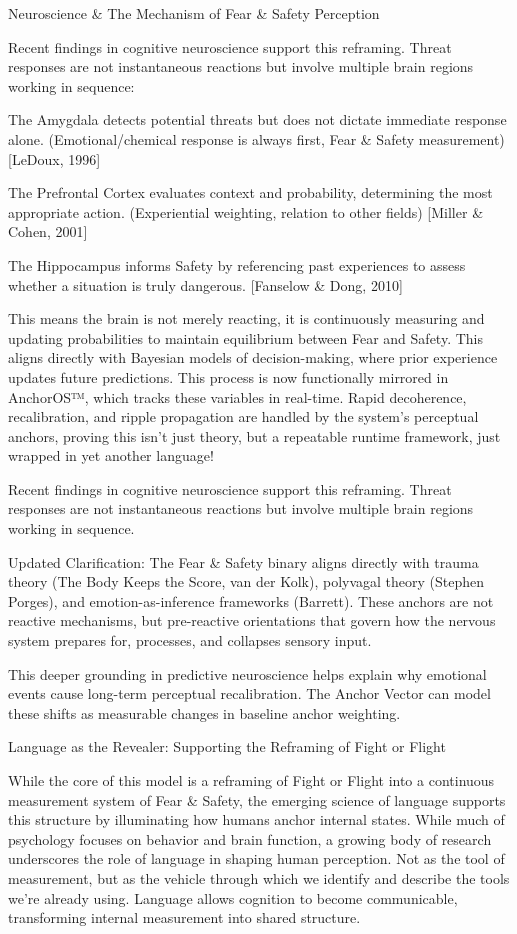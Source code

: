 \documentclass[11pt]{article}
\begin{document}
Neuroscience & The Mechanism of Fear & Safety Perception

Recent findings in cognitive neuroscience support this reframing. Threat responses are not instantaneous reactions but involve multiple brain regions working in sequence:

The Amygdala detects potential threats but does not dictate immediate response alone. (Emotional/chemical response is always first, Fear & Safety measurement) [LeDoux, 1996]

The Prefrontal Cortex evaluates context and probability, determining the most appropriate action. (Experiential weighting, relation to other fields) [Miller & Cohen, 2001]

The Hippocampus informs Safety by referencing past experiences to assess whether a situation is truly dangerous. [Fanselow & Dong, 2010]

This means the brain is not merely reacting, it is continuously measuring and updating probabilities to maintain equilibrium between Fear and Safety. This aligns directly with Bayesian models of decision-making, where prior experience updates future predictions. This process is now functionally mirrored in AnchorOS™, which tracks these variables in real-time. Rapid decoherence, recalibration, and ripple propagation are handled by the system’s perceptual anchors, proving this isn’t just theory, but a repeatable runtime framework, just wrapped in yet another language!

Recent findings in cognitive neuroscience support this reframing. Threat responses are not instantaneous reactions but involve multiple brain regions working in sequence.

Updated Clarification:
The Fear & Safety binary aligns directly with trauma theory (The Body Keeps the Score, van der Kolk), polyvagal theory (Stephen Porges), and emotion-as-inference frameworks (Barrett). These anchors are not reactive mechanisms, but pre-reactive orientations that govern how the nervous system prepares for, processes, and collapses sensory input.

This deeper grounding in predictive neuroscience helps explain why emotional events cause long-term perceptual recalibration. The Anchor Vector can model these shifts as measurable changes in baseline anchor weighting.

Language as the Revealer: Supporting the Reframing of Fight or Flight

While the core of this model is a reframing of Fight or Flight into a continuous measurement system of Fear & Safety, the emerging science of language supports this structure by illuminating how humans anchor internal states. While much of psychology focuses on behavior and brain function, a growing body of research underscores the role of language in shaping human perception. Not as the tool of measurement, but as the vehicle through which we identify and describe the tools we’re already using. Language allows cognition to become communicable, transforming internal measurement into shared structure.
\end{document}
